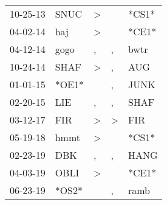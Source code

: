 \begin{supertabular}{lllll}
 10-25-13 &   SNUC &     \textgreater &               &  *CS1* \\
 04-02-14 &    haj &     \textgreater &               &  *CE1* \\
 04-12-14 &   gogo &                , &             , &   bwtr \\
 10-24-14 &   SHAF &     \textgreater &             , &    AUG \\
 01-01-15 &  *OE1* &                  &             , &   JUNK \\
 02-20-15 &    LIE &                , &             , &   SHAF \\
 03-12-17 &    FIR &     \textgreater &  \textgreater &    FIR \\
 05-19-18 &   hmmt &     \textgreater &               &  *CS1* \\
 02-23-19 &    DBK &                , &             , &   HANG \\
 04-03-19 &   OBLI &     \textgreater &               &  *CE1* \\
 06-23-19 &  *OS2* &                  &             , &   ramb \\
\end{supertabular}
